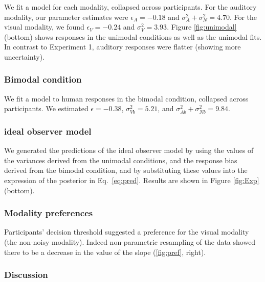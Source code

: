 \documentclass[10pt,letterpaper]{article}
\begin{document}
We fit a model for each modality, collapsed across participants. For the auditory modality, our parameter estimates were $\epsilon_A=-0.18$ and $\sigma^2_A+\sigma^2_N=4.70$. For the visual modality, we found $\epsilon_V=-0.24$ and $\sigma^2_V=3.93$.  Figure \ref{fig:unimodal} (bottom) shows responses in the unimodal conditions as well as the unimodal fits. In contrast to Experiment 1, auditory responses were flatter (showing more uncertainty).

\subsubsection{Bimodal condition}

We fit a model to human responses in the bimodal condition, collapsed across participants. We estimated $\epsilon=-0.38$, $\sigma^2_{Vb}=5.21$, and  $\sigma^2_{Ab}+\sigma^2_{Nb}=9.84$.

\subsubsection{ideal observer model}

We generated the predictions of the ideal observer model by using the values of the variances derived from the unimodal conditions, and the response bias derived from the bimodal condition, and by substituting these values into the expression of the posterior in Eq.~\ref{eq:pred}.
Results are shown in Figure \ref{fig:Exp} (bottom).
 
\subsubsection{Modality preferences}

Participants' decision threshold suggested a preference for the visual modality (the non-noisy modality). Indeed non-parametric resampling of the data showed there to be a decrease in the value of the slope (\ref{fig:pref}, right).

\subsubsection{Discussion}
\end{document}
